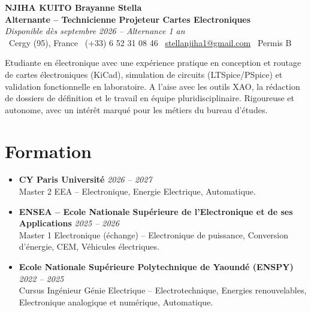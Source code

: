 \documentclass[a4paper,11pt]{article}
\begin{document}
\begin{center}
    {\large \textbf{NJIHA KUITO Brayanne Stella}} \\ \vspace{2pt}
    \textbf{Alternante -- Technicienne Projeteur Cartes Electroniques} \\
    \textit{\small Disponible dès septembre 2026 -- Alternance 1 an} \\ \vspace{2pt}
    \small
    \faMapMarker\ Cergy (95), France \quad
    \faPhone\ (+33) 6 52 31 08 46 \quad
    \faEnvelope\ \href{mailto:stellanjiha1@gmail.com}{stellanjiha1@gmail.com} \quad
    \faCar\ Permis B
\end{center}

\vspace{-2pt}

\noindent\small{Etudiante en électronique avec une expérience pratique en conception et routage de cartes électroniques (KiCad), simulation de circuits (LTSpice/PSpice) et validation fonctionnelle en laboratoire. A l'aise avec les outils XAO, la rédaction de dossiers de définition et le travail en équipe pluridisciplinaire. Rigoureuse et autonome, avec un intérêt marqué pour les métiers du bureau d'études.}

\vspace{2pt}

\section{Formation}
\begin{itemize}[leftmargin=*, label=\tiny$\bullet$, nosep]
    \item \textbf{CY Paris Université} \hfill \textit{2026 -- 2027} \\
    \small{Master 2 EEA -- Electronique, Energie Electrique, Automatique.}
    \item \textbf{ENSEA -- Ecole Nationale Supérieure de l'Electronique et de ses Applications} \hfill \textit{2025 -- 2026} \\
    \small{Master 1 Electronique (échange) -- Electronique de puissance, Conversion d'énergie, CEM, Véhicules électriques.}
    \item \textbf{Ecole Nationale Supérieure Polytechnique de Yaoundé (ENSPY)} \hfill \textit{2022 -- 2025} \\
    \small{Cursus Ingénieur Génie Electrique -- Electrotechnique, Energies renouvelables, Electronique analogique et numérique, Automatique.}
\end{itemize}
\end{document}
